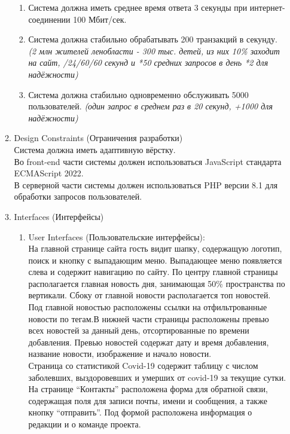 \begin{enumerate}
\begin{enumerate}[label=3.\arabic*]
\begin{enumerate}[label=3.4.\arabic*]
            \item Система должна иметь среднее время ответа 3 секунды при интернет-соединении 100 Мбит/сек.
            \item Система должна стабильно обрабатывать 200 транзакций в секунду. \\
            \tiny \textit{(2 млн жителей ленобласти - 300 тыс. детей, из них 10\% заходит на сайт, /24/60/60 секунд и *50 средних запросов в день *2 для надёжности)}
            \normalsize
            \item Система должна стабильно одновременно обслуживать 5000 пользователей.
            \tiny \textit{(один запрос в среднем раз в 20 секунд, +1000 для надёжности)}
            \normalsize
        \end{enumerate}
        \item Design Constraints (Ограничения разработки) \\
        Система должна иметь адаптивную вёрстку. \\
        Во front-end части системы должен использоваться JavaScript стандарта ECMAScript 2022. \\
        В серверной части системы должен использоваться PHP версии 8.1 для обработки запросов пользователей.
        \item Interfaces (Интерфейсы)
        \BgThispage
        \begin{enumerate}[label=3.6.\arabic*]
            \item User Interfaces (Пользовательские интерфейсы): \\
            На главной странице сайта гость видит шапку, содержащую логотип, поиск и кнопку с выпадающим меню.
            Выпадающее меню появляется слева и содержит навигацию по сайту. По центру главной страницы
            располагается главная новость дня, занимающая 50\% пространства по вертикали. Сбоку от главной
            новости располагается топ новостей. Под главной новостью расположены ссылки на отфильтрованные
            новости по тегам.В нижней части страницы расположены превью всех новостей за данный день, отсортированные
            по времени добавления. Превью новостей содержат дату и время добавления, название новости, изображение и начало новости. \\
            \newpage
            Страница со статистикой Covid-19 содержит таблицу с числом заболевших, выздоровевших и умерших от covid-19 за текущие сутки. \\
            На странице ``Контакты'' расположена форма для обратной связи, содержащая поля для записи почты, имени и сообщения, а также кнопку ``отправить''. Под формой расположена информация о редакции и о команде проекта. \\

\end{enumerate}
\end{enumerate}
\end{enumerate}
